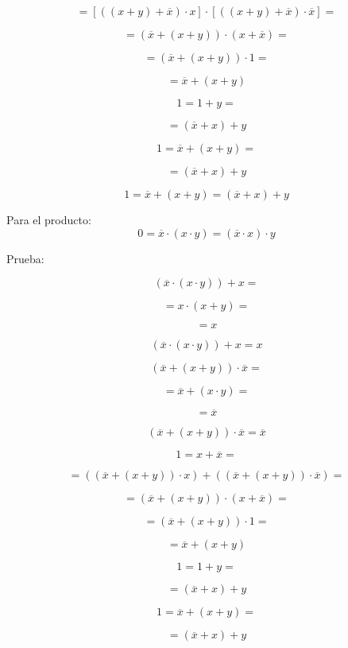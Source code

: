 \[{= {\left\lbrack {\left( {\left( {x + y} \right) + \overline{x}} \right) \cdot x} \right\rbrack \cdot \left\lbrack {\left( {\left( {x + y} \right) + \overline{x}} \right) \cdot \overline{x}} \right\rbrack}} =\]

\[{= {{({\overline{x} + {({x + y})}})} \cdot {({x + \overline{x}})}}} =\]

\[{= {{({\overline{x} + {({x + y})}})} \cdot 1}} =\]

\[= {\overline{x} + {({x + y})}}\]

\[{1 = {1 + y}} = {}\]

\[= {{({\overline{x} + x})} + y}\]

\[{1 = {\overline{x} + {({x + y})}}} = {}\]

\[= {{({\overline{x} + x})} + y}\]

\[{1 = {\overline{x} + {({x + y})}}} = {{({\overline{x} + x})} + y}\]

Para el
producto:\[{0 = {\overline{x} \cdot {({x \cdot y})}}} = {{({\overline{x} \cdot x})} \cdot y}\]

Prueba:

\[{{({\overline{x} \cdot {({x \cdot y})}})} + x} = {}\]

\[{= {x \cdot {({x + y})}}} =\]

\[= x\]

\[{{{({\overline{x} \cdot {({x \cdot y})}})} + x} = x}{}\]

\[{{({\overline{x} + {({x + y})}})} \cdot \overline{x}} = {}\]

\[{= {\overline{x} + {({x \cdot y})}}} = {}\]

\[= \overline{x}\]

\[{{{({\overline{x} + {({x + y})}})} \cdot \overline{x}} = \overline{x}}{}\]

\[{1 = {x + \overline{x}}} = {}\]

\[{= {{({{({\overline{x} + {({x + y})}})} \cdot x})} + {({{({\overline{x} + {({x + y})}})} \cdot \overline{x}})}}} =\]

\[{= {{({\overline{x} + {({x + y})}})} \cdot {({x + \overline{x}})}}} =\]

\[{= {{({\overline{x} + {({x + y})}})} \cdot 1}} =\]

\[= {\overline{x} + {({x + y})}}\]

\[{1 = {1 + y}} = {}\]

\[= {{({\overline{x} + x})} + y}\]

\[{1 = {\overline{x} + {({x + y})}}} = {}\]

\[= {{({\overline{x} + x})} + y}\]

